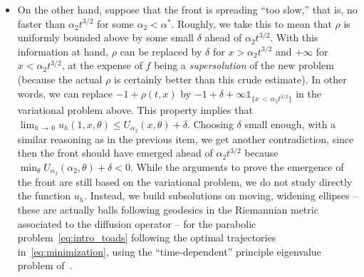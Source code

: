 \documentclass[10pt]{amsart}
\theoremstyle{definition}\newtheorem{defi}[theo]{Definition}\newtheorem{rema}[theo]{Remark}\newtheorem{exam}[theo]{Example}\newtheorem{exem}[theo]{Example}\newtheorem{nota}[theo]{Notation}
\newcommand{\1}{\mathds{1}}
\begin{document}
\begin{itemize}
\item On the other hand, suppose that the front is spreading ``too slow,'' that is, no faster than $\alpha_2 t^{3/2}$ for some $\alpha_2<\alpha^*$. Roughly, we take this to mean that $\rho$ is uniformly bounded above by some small $\delta$ ahead of $\alpha_2 t^{3/2}$. With this information at hand, $\rho$ can be replaced by $\delta $ for $x > \alpha_2 t^{3/2}$ and $+\infty$ for $x < \alpha_2 t^{3/2}$, at the expense of $f$ being a \emph{supersolution} of the new problem (because the actual $\rho$ is certainly better than this crude estimate). In other words, we can replace $-1+\rho(t,x)$ by $-1+\delta+\infty \1_{\{ x\,<\,\alpha_2 t^{3/2}\}}$ in the variational problem above. This property implies that $\lim_{h\,\to\,0} u_h(1,x,\theta) \leq U_{\alpha_2}(x,\theta)+\delta$. Choosing $\delta$ small enough, with a similar reasoning as in the previous item, we get another contradiction, since then the front should have emerged ahead of $\alpha_2 t^{3/2}$ because $\min_\theta U_{\alpha_2}(\alpha_2,\theta) +\delta<0$. While the arguments to prove the emergence of the front are still based on the variational problem, we do not study directly the function $u_h$. Instead, we build subsolutions on moving, widening ellipses -- these are actually balls following geodesics in the Riemannian metric associated to the diffusion operator -- for the parabolic problem~\eqref{eq:intro_toads} following the optimal trajectories in~\eqref{eq:minimization}, using the ``time-dependent'' principle eigenvalue problem of~\cite{BHR_acceleration}.
\end{itemize}
\end{document}
